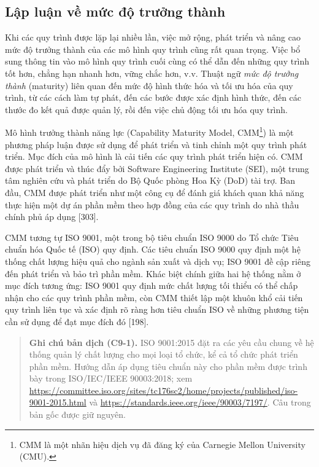 
\subsection{Lập luận về mức độ trưởng thành}
Khi các quy trình được lặp lại nhiều lần, việc mở rộng, phát triển và nâng cao mức độ trưởng thành của các mô hình quy trình cũng rất quan trọng. Việc bổ sung thông tin vào mô hình quy trình cuối cùng có thể dẫn đến những quy trình tốt hơn, chẳng hạn nhanh hơn, vững chắc hơn, v.v. Thuật ngữ \emph{mức độ trưởng thành} (maturity) liên quan đến mức độ hình thức hóa và tối ưu hóa của quy trình, từ các cách làm tự phát, đến các bước được xác định hình thức, đến các thước đo kết quả được quản lý, rồi đến việc chủ động tối ưu hóa quy trình.

Mô hình trưởng thành năng lực (Capability Maturity Model, CMM\footnote{CMM là một nhãn hiệu dịch vụ đã đăng ký của Carnegie Mellon University (CMU).}) là một phương pháp luận được sử dụng để phát triển và tinh chỉnh một quy trình phát triển. Mục đích của mô hình là cải tiến các quy trình phát triển hiện có. CMM được phát triển và thúc đẩy bởi Software Engineering Institute (SEI), một trung tâm nghiên cứu và phát triển do Bộ Quốc phòng Hoa Kỳ (DoD) tài trợ. Ban đầu, CMM được phát triển như một công cụ để đánh giá khách quan khả năng thực hiện một dự án phần mềm theo hợp đồng của các quy trình do nhà thầu chính phủ áp dụng [303].

CMM tương tự ISO 9001, một trong bộ tiêu chuẩn ISO 9000 do Tổ chức Tiêu chuẩn hóa Quốc tế (ISO) quy định. Các tiêu chuẩn ISO 9000 quy định một hệ thống chất lượng hiệu quả cho ngành sản xuất và dịch vụ; ISO 9001 đề cập riêng đến phát triển và bảo trì phần mềm. Khác biệt chính giữa hai hệ thống nằm ở mục đích tương ứng: ISO 9001 quy định mức chất lượng tối thiểu có thể chấp nhận cho các quy trình phần mềm, còn CMM thiết lập một khuôn khổ cải tiến quy trình liên tục và xác định rõ ràng hơn tiêu chuẩn ISO về những phương tiện cần sử dụng để đạt mục đích đó [198].
\begin{quote}\small
\textbf{Ghi chú bản dịch (C9-1).} ISO 9001:2015 đặt ra các yêu cầu chung về hệ thống quản lý chất lượng cho mọi loại tổ chức, kể cả tổ chức phát triển phần mềm. Hướng dẫn áp dụng tiêu chuẩn này cho phần mềm được trình bày trong ISO/IEC/IEEE 90003:2018; xem \url{https://committee.iso.org/sites/tc176sc2/home/projects/published/iso-9001-2015.html} và \url{https://standards.ieee.org/ieee/90003/7197/}. Câu trong bản gốc được giữ nguyên.
\end{quote}

